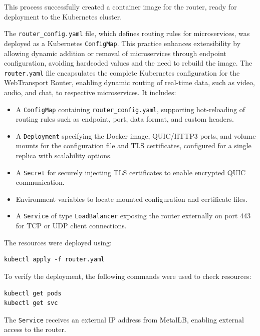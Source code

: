 This process successfully created a container image for the router, ready for deployment to the Kubernetes cluster.

The \texttt{router\_config.yaml} file, which defines routing rules for microservices, was deployed as a Kubernetes \texttt{ConfigMap}. This practice enhances extensibility by allowing dynamic addition or removal of microservices through endpoint configuration, avoiding hardcoded values and the need to rebuild the image. The \texttt{router.yaml} file encapsulates the complete Kubernetes configuration for the WebTransport Router, enabling dynamic routing of real-time data, such as video, audio, and chat, to respective microservices. It includes:

\begin{itemize}
    \item A \texttt{ConfigMap} containing \texttt{router\_config.yaml}, supporting hot-reloading of routing rules such as endpoint, port, data format, and custom headers.
    \item A \texttt{Deployment} specifying the Docker image, QUIC/HTTP3 ports, and volume mounts for the configuration file and TLS certificates, configured for a single replica with scalability options.
    \item A \texttt{Secret} for securely injecting TLS certificates to enable encrypted QUIC communication.
    \item Environment variables to locate mounted configuration and certificate files.
    \item A \texttt{Service} of type \texttt{LoadBalancer} exposing the router externally on port 443 for TCP or UDP client connections.
\end{itemize}

The resources were deployed using:

\begin{lstlisting}[breaklines=true,basicstyle=\small\ttfamily,frame=single]
kubectl apply -f router.yaml
\end{lstlisting}

To verify the deployment, the following commands were used to check resources:

\begin{lstlisting}[breaklines=true,basicstyle=\small\ttfamily,frame=single]
kubectl get pods
kubectl get svc
\end{lstlisting}

The \texttt{Service} receives an external IP address from MetalLB, enabling external access to the router.

